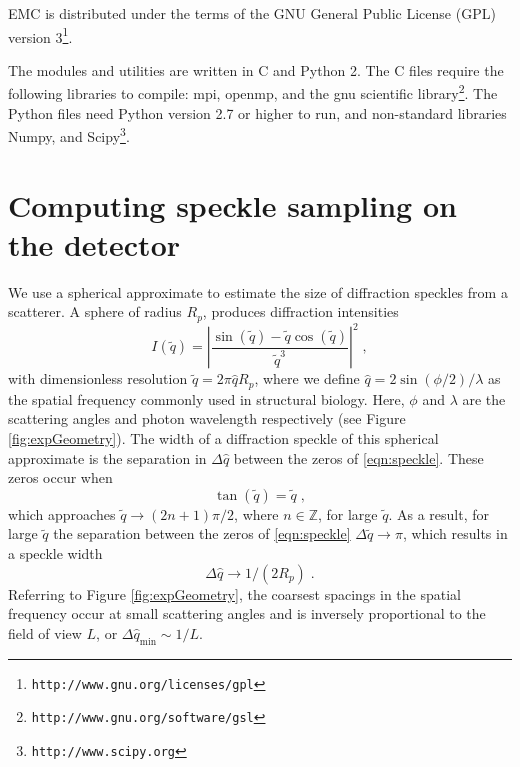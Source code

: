 \documentclass[]{iucr}              %
\begin{document}
EMC is distributed under the terms of the GNU General Public License (GPL) version 3\footnote{\texttt{http://www.gnu.org/licenses/gpl}}.

The modules and utilities are written in C and Python 2. The C files require the following libraries to compile: mpi, openmp, and the gnu scientific library\footnote{\texttt{http://www.gnu.org/software/gsl}}. The Python files need Python version 2.7 or higher to run, and non-standard libraries Numpy, and Scipy\footnote{\texttt{http://www.scipy.org}}.


\appendix

\section{Computing speckle sampling on the detector}\label{sec:speckle}
We use a spherical approximate to estimate the size of diffraction speckles from a scatterer. A sphere of radius $R_p$, produces diffraction intensities 
\begin{equation}
I(\widetilde{q}) = \left|\frac{\sin(\widetilde{q}) - \widetilde{q} \cos(\widetilde{q})} {\widetilde{q}^3} \right|^2 \;, \label{eqn:speckle}
\end{equation}
with dimensionless resolution $\widetilde{q} = 2 \pi \widehat{q} R_p$, where we define $\widehat{q} = 2 \sin(\phi/2) / \lambda$ as the spatial frequency commonly used in structural biology. Here, $\phi$ and $\lambda$ are the scattering angles and photon wavelength respectively (see Figure \ref{fig:expGeometry}). The width of a diffraction speckle of this spherical approximate is the separation in $\Delta \widehat{q} $ between the zeros of \eqref{eqn:speckle}. These zeros occur when 
\begin{equation}
\tan(\widetilde{q}) = \widetilde{q} \;,
\end{equation}
which approaches $\widetilde{q} \to (2n+1) \pi / 2$, where $n \in \mathbb{Z}$, for large $\widetilde{q}$. As a result, for large $\widetilde{q}$ the separation between the zeros of \eqref{eqn:speckle} $\Delta \widetilde{q} \to \pi$, which results in a speckle width 
\begin{equation}
\Delta \widehat{q} \to 1/(2 R_p) \; .
\end{equation}
Referring to Figure \ref{fig:expGeometry}, the coarsest spacings in the spatial frequency occur at small scattering angles and is inversely proportional to the field of view $L$, or $\Delta \widehat{q}_{\text{min}} \sim 1/L$. 
\end{document}
